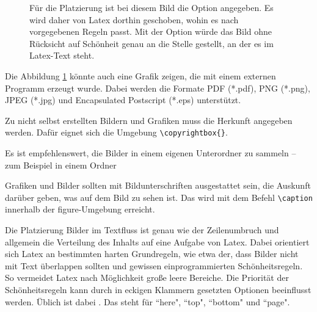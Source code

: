 \documentclass[ngerman]{scrartcl}
\begin{document}
\begin{figure}[htbp!]
	\centering
		\caption{Für die Platzierung ist bei diesem Bild die Option \code{[htbp!]} angegeben. Es wird daher von Latex dorthin geschoben, wohin es nach vorgegebenen Regeln passt. Mit der Option \code{[H]} würde das Bild ohne Rücksicht auf Schönheit genau an die Stelle gestellt, an der es im Latex-Text steht.}
	\label{fig:Platzhalter}
\end{figure}

Die Abbildung \ref{fig:Platzhalter} könnte auch eine Grafik zeigen, die mit einem externen Programm erzeugt wurde. Dabei werden die Formate PDF (*.pdf),
PNG (*.png), JPEG (*.jpg) und Encapsulated Postscript (*.eps) unterstützt.

Zu nicht selbst erstellten Bildern und Grafiken muss die Herkunft angegeben werden. Dafür eignet sich die Umgebung \verb|\copyrightbox{}|.

Es ist empfehlenswert, die Bilder in einem eigenen Unterordner zu sammeln -- zum Beispiel in einem Ordner 

Grafiken und Bilder sollten mit Bildunterschriften ausgestattet sein, die Auskunft darüber geben, was auf dem Bild zu sehen ist. Das wird mit dem Befehl \verb|\caption| innerhalb der figure-Umgebung erreicht.

Die Platzierung Bilder im Textfluss ist genau wie der Zeilenumbruch und allgemein die Verteilung des Inhalts auf eine Aufgabe von Latex. Dabei orientiert sich Latex an bestimmten harten Grundregeln, wie etwa der, dass Bilder nicht mit Text überlappen sollten und gewissen einprogrammierten Schönheitsregeln. So vermeidet Latex nach Möglichkeit große leere Bereiche. Die Priorität der Schönheitsregeln kann durch in eckigen Klammern gesetzten Optionen beeinflusst werden. Üblich ist dabei \code{[htbp!]}. Das steht für ``here", ``top", ``bottom" und ``page".
\end{document}
